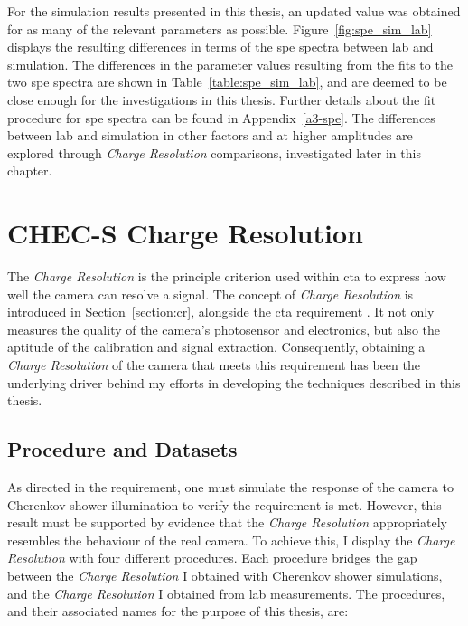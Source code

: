 For the simulation results presented in this thesis, an updated value was obtained for as many of the relevant  parameters as possible. Figure~\ref{fig:spe_sim_lab} displays the resulting differences in terms of the \gls{spe} spectra between lab and simulation. The differences in the parameter values resulting from the fits to the two \gls{spe} spectra are shown in Table~\ref{table:spe_sim_lab}, and are deemed to be close enough for the investigations in this thesis. Further details about the fit procedure for \gls{spe} spectra can be found in Appendix~\ref{a3-spe}. The differences between lab and simulation in other factors and at higher amplitudes are explored through \textit{Charge Resolution} comparisons, investigated later in this chapter.

\section{CHEC-S Charge Resolution}

The \textit{Charge Resolution} is the principle criterion used within \gls{cta} to express how well the camera can resolve a signal. The concept of \textit{Charge Resolution} is introduced in Section~\ref{section:cr}, alongside the \gls{cta} requirement . It not only measures the quality of the camera's photosensor and electronics, but also the aptitude of the calibration and signal extraction. Consequently, obtaining a \textit{Charge Resolution} of the camera that meets this requirement has been the underlying driver behind my efforts in developing the techniques described in this thesis.

\subsection{Procedure and Datasets} \label{section:crprocedure}

As directed in the  requirement, one must simulate the response of the camera to Cherenkov shower illumination to verify the requirement is met. However, this result must be supported by evidence that the \textit{Charge Resolution} appropriately resembles the behaviour of the real camera. To achieve this, I display the \textit{Charge Resolution} with four different procedures. Each procedure bridges the gap between the \textit{Charge Resolution} I obtained with Cherenkov shower simulations, and the \textit{Charge Resolution} I obtained from lab measurements. The procedures, and their associated names for the purpose of this thesis, are:

